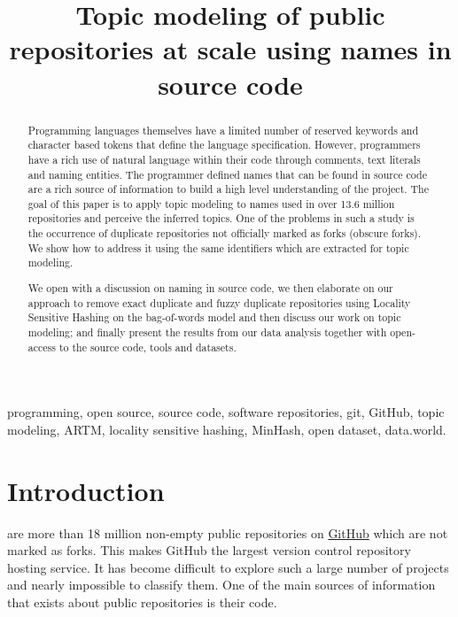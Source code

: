 \documentclass[conference,10pt]{IEEEtran}
\author{
\IEEEauthorblockN{Vadim Markovtsev\\\texttt{vadim@sourced.tech}}
\and
\IEEEauthorblockN{Eiso Kant\\\texttt{eiso@sourced.tech}}
}
\title{Topic modeling of public repositories at scale using names in source code}
\begin{document}

\begin{abstract}
Programming languages themselves have a limited number of reserved keywords and character based tokens that define the language specification. However, programmers have a rich use of natural language within their code through comments, text literals and naming entities. The programmer defined names that can be found in source code are a rich source of information to build a high level understanding of the project. The goal of this paper is to apply topic modeling to names used in over 13.6 million repositories and perceive the inferred topics. One of the problems in such a study is the occurrence of duplicate repositories not officially marked as forks (obscure forks). We show how to address it using the same identifiers which are extracted for topic modeling.

We open with a discussion on naming in source code, we then elaborate on our approach to remove exact duplicate and fuzzy duplicate repositories using Locality Sensitive Hashing on the bag-of-words model and then discuss our work on topic modeling; and finally present the results from our data analysis together with open-access to the source code, tools and datasets.
\end{abstract}

\begin{IEEEkeywords}
programming, open source, source code, software repositories, git, GitHub, topic modeling, ARTM, locality sensitive hashing, MinHash, open dataset, data.world.
\end{IEEEkeywords}

\section{Introduction}

 are more than 18 million non-empty public repositories on \href{https://github.com}{GitHub} which are not marked as forks. This makes GitHub the largest version control repository hosting service. It has become difficult to explore such a large number of projects and nearly impossible to classify them. One of the main sources of information that exists about public repositories is their code.
\end{document}
